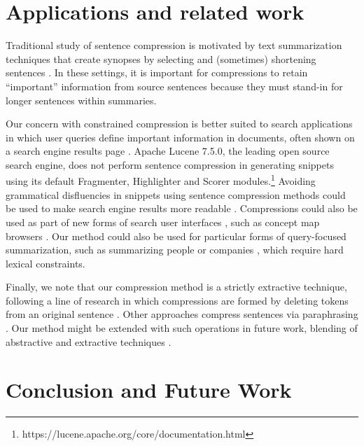\documentclass[11pt,a4paper]{article}
\begin{document}
\section{Applications and related work}

Traditional study of sentence compression is motivated by text summarization techniques that create synopses by selecting and (sometimes) shortening sentences \cite{Knight2000StatisticsBasedS,vanderwende2007beyond,martins2009summarization}. 
In these settings, it is important for compressions to retain ``important'' information from source sentences because they must stand-in for longer sentences within summaries.

Our concern with constrained compression is better suited to search applications in which user queries define important information in documents, often shown on a search engine results page \cite{tombros1998advantages,Metzler2008MachineLS}. %
Apache Lucene 7.5.0, the leading open source search engine, does not perform sentence compression in generating snippets using its default Fragmenter, Highlighter and Scorer modules.\footnote{https://lucene.apache.org/core/documentation.html} Avoiding grammatical disfluencies in snippets using sentence compression methods could be used to make search engine results more readable \cite{kanungo2009predicting}. Compressions could also be used as part of new forms of search user interfaces \cite{hearst2009search}, such as concept map browsers \cite{falke2017graphdocexplore}. Our method could also be used for particular forms of query-focused summarization, such as summarizing people \cite{w04} or companies \cite{filippova2009company}, which require hard lexical constraints. 

Finally, we note that our compression method is a strictly extractive technique, following a line of research in which compressions are formed by deleting tokens from an original sentence \cite{clarke2008global,filippova2008dependency,filippova2015sentence}. Other approaches compress sentences via paraphrasing \cite{rush2015neural,mallinson18}. Our method might be extended with such operations in future work, blending of abstractive and extractive techniques \cite{P17-1099}. 

\section{Conclusion and Future Work}
\end{document}
